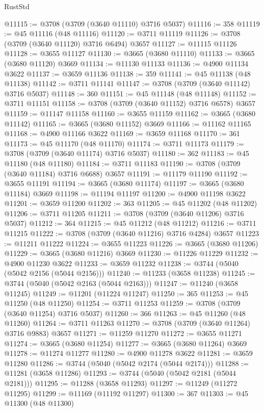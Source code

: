 \begin{lexlean}{RustStd}
\begin{coremodule}
@11115 := @3708 (@3709 (@3640 @11110) @3716 @5037)
@11116 := 358
@11119 := @45 @11116 (@48 @11116)
@11120 := @3711 @11119
@11126 := @3708 (@3709 (@3640 @11120) @3716 @6494) @3657
@11127 := @11115 @11126
@11128 := @3655 @11127
@11130 := @3665 (@3680 @11110)
@11133 := @3665 (@3680 @11120) @3669
@11134 := @11130 @11133
@11136 := @4900 @11134 @3622
@11137 := @3659 @11136
@11138 := 359
@11141 := @45 @11138 (@48 @11138)
@11142 := @3711 @11141
@11147 := @3708 (@3709 (@3640 @11142) @3716 @5037)
@11148 := 360
@11151 := @45 @11148 (@48 @11148)
@11152 := @3711 @11151
@11158 := @3708 (@3709 (@3640 @11152) @3716 @6578) @3657
@11159 := @11147 @11158
@11160 := @3655 @11159
@11162 := @3665 (@3680 @11142)
@11165 := @3665 (@3680 @11152) @3669
@11166 := @11162 @11165
@11168 := @4900 @11166 @3622
@11169 := @3659 @11168
@11170 := 361
@11173 := @45 @11170 (@48 @11170)
@11174 := @3711 @11173
@11179 := @3708 (@3709 (@3640 @11174) @3716 @5037)
@11180 := 362
@11183 := @45 @11180 (@48 @11180)
@11184 := @3711 @11183
@11190 := @3708 (@3709 (@3640 @11184) @3716 @6688) @3657
@11191 := @11179 @11190
@11192 := @3655 @11191
@11194 := @3665 (@3680 @11174)
@11197 := @3665 (@3680 @11184) @3669
@11198 := @11194 @11197
@11200 := @4900 @11198 @3622
@11201 := @3659 @11200
@11202 := 363
@11205 := @45 @11202 (@48 @11202)
@11206 := @3711 @11205
@11211 := @3708 (@3709 (@3640 @11206) @3716 @5037)
@11212 := 364
@11215 := @45 @11212 (@48 @11212)
@11216 := @3711 @11215
@11222 := @3708 (@3709 (@3640 @11216) @3716 @4284) @3657
@11223 := @11211 @11222
@11224 := @3655 @11223
@11226 := @3665 (@3680 @11206)
@11229 := @3665 (@3680 @11216) @3669
@11230 := @11226 @11229
@11232 := @4900 @11230 @3622
@11233 := @3659 @11232
@11238 := @3744 (@5040 (@5042 @2156 (@5044 @2156)))
@11240 := @11233 (@3658 @11238)
@11245 := @3744 (@5040 (@5042 @2163 (@5044 @2163)))
@11247 := @11240 (@3658 @11245)
@11249 := @11201 (@11224 @11247)
@11250 := 365
@11253 := @45 @11250 (@48 @11250)
@11254 := @3711 @11253
@11259 := @3708 (@3709 (@3640 @11254) @3716 @5037)
@11260 := 366
@11263 := @45 @11260 (@48 @11260)
@11264 := @3711 @11263
@11270 := @3708 (@3709 (@3640 @11264) @3716 @9883) @3657
@11271 := @11259 @11270
@11272 := @3655 @11271
@11274 := @3665 (@3680 @11254)
@11277 := @3665 (@3680 @11264) @3669
@11278 := @11274 @11277
@11280 := @4900 @11278 @3622
@11281 := @3659 @11280
@11286 := @3744 (@5040 (@5042 @2174 (@5044 @2174)))
@11288 := @11281 (@3658 @11286)
@11293 := @3744 (@5040 (@5042 @2181 (@5044 @2181)))
@11295 := @11288 (@3658 @11293)
@11297 := @11249 (@11272 @11295)
@11299 := @11169 (@11192 @11297)
@11300 := 367
@11303 := @45 @11300 (@48 @11300)

\end{coremodule}
\end{lexlean}

